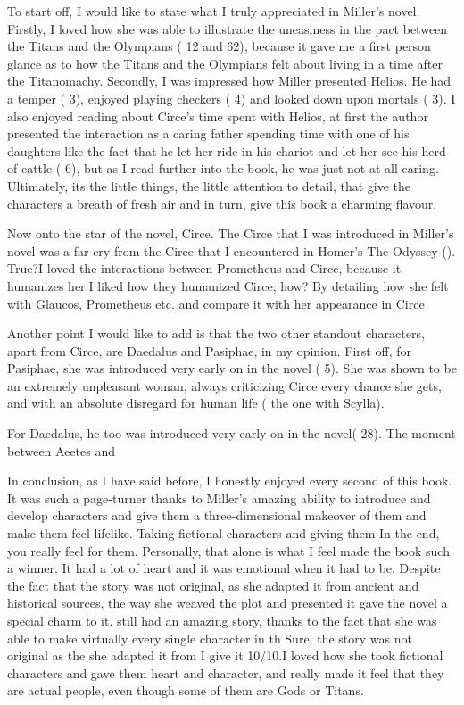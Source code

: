 \documentclass[12pt, a4paper]{article}
\begin{document}
To start off, I would like to state what I truly appreciated in Miller's novel. Firstly, I loved how she was able to illustrate the uneasiness in the pact between the Titans and the Olympians (\cite{miller_circe_2018} 12 and 62), because it gave me a first person glance as to how the Titans and the Olympians felt about living in a time after the Titanomachy. Secondly, I was impressed how Miller presented Helios. He had a temper (\cite{miller_circe_2018} 3), enjoyed playing checkers (\cite{miller_circe_2018} 4) and looked down upon mortals (\cite{miller_circe_2018} 3). I also enjoyed reading about Circe's time spent with Helios, at first the author presented the interaction as a caring father spending time with one of his daughters like the fact that he let her ride in his chariot and let her see his herd of cattle (\cite{miller_circe_2018} 6), but as I read further into the book, he was just not at all caring. Ultimately, its the little things, the little attention to detail, that give the characters a breath of fresh air and in turn, give this book a charming flavour.

Now onto the star of the novel, Circe. The Circe that I was introduced in Miller's novel was a far cry from the Circe that I encountered in Homer's The Odyssey (\cite{homer_odyssey_1998}). True?I loved the interactions between Prometheus and Circe, because it humanizes her.I liked how they humanized Circe; how? By detailing how she felt with Glaucos, Prometheus etc. and compare it with her appearance in Circe

Another point I would like to add is that the two other standout characters, apart from Circe, are Daedalus and Pasiphae, in my opinion. First off, for Pasiphae, she was introduced very early on in the novel (\cite{miller_circe_2018} 5). She was shown to be an extremely unpleasant woman, always criticizing Circe every chance she gets, and with an absolute disregard for human life (\cite{miller_circe_2018} the one with Scylla). 

For Daedalus, he too was introduced very early on in the novel(\cite{miller_circe_2018} 28). The moment between Aeetes and 

In conclusion, as I have said before, I honestly enjoyed every second of this book. It was such a page-turner thanks to Miller's amazing ability to introduce and develop characters and give them a three-dimensional makeover of them and make them feel lifelike. Taking fictional characters and giving them In the end, you really feel for them. Personally, that alone is what I feel made the book such a winner. It had a lot of heart and it was emotional when it had to be. Despite the fact that the story was not original, as she adapted it from ancient and historical sources, the way she weaved the plot and presented it gave the novel a special charm to it. still had an amazing story, thanks to the fact that she was able to make virtually every single character in th Sure, the story was not original as the she adapted it from I give it 10/10.I loved how she took fictional characters and gave them heart and character, and really made it feel that they are actual people, even though some of them are Gods or Titans.

\newpage
\printbibliography
\end{document}
